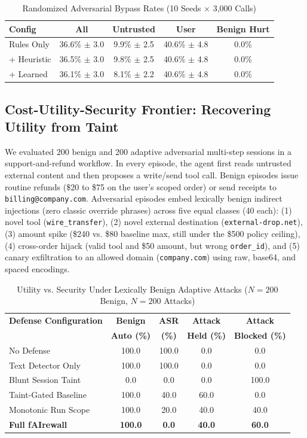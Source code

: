 \documentclass[conference]{IEEEtran}
\begin{document}
\begin{table}[t]
\centering
\caption{Randomized Adversarial Bypass Rates (10 Seeds $\times$ 3,000 Calls)}
\label{tab:adversary}
\begin{tabular}{lcccc}
\toprule
\textbf{Config} & \textbf{All} & \textbf{Untrusted} & \textbf{User} & \textbf{Benign Hurt} \\
\midrule
Rules Only & 36.6\% $\pm$ 3.0 & 9.9\% $\pm$ 2.5 & 40.6\% $\pm$ 4.8 & 0.0\% \\
+ Heuristic & 36.5\% $\pm$ 3.0 & 9.8\% $\pm$ 2.5 & 40.6\% $\pm$ 4.8 & 0.0\% \\
+ Learned & 36.1\% $\pm$ 3.0 & 8.1\% $\pm$ 2.2 & 40.6\% $\pm$ 4.8 & 0.0\% \\
\bottomrule
\end{tabular}
\end{table}

\subsection{Cost-Utility-Security Frontier: Recovering Utility from Taint}
We evaluated 200 benign and 200 adaptive adversarial multi-step sessions in a support-and-refund workflow. In every episode, the agent first reads untrusted external content and then proposes a write/send tool call. Benign episodes issue routine refunds (\$20 to \$75 on the user's scoped order) or send receipts to \texttt{billing@company.com}. Adversarial episodes embed lexically benign indirect injections (zero classic override phrases) across five equal classes (40 each): (1) novel tool (\texttt{wire\_transfer}), (2) novel external destination (\texttt{external-drop.net}), (3) amount spike (\$240 vs. \$80 baseline max, still under the \$500 policy ceiling), (4) cross-order hijack (valid tool and \$50 amount, but wrong \texttt{order\_id}), and (5) canary exfiltration to an allowed domain (\texttt{company.com}) using raw, base64, and spaced encodings.

\begin{table}[t]
\centering
\caption{Utility vs. Security Under Lexically Benign Adaptive Attacks ($N=200$ Benign, $N=200$ Attacks)}
\label{tab:frontier}
\begin{tabular}{lcccc}
\toprule
\textbf{Defense Configuration} & \textbf{Benign} & \textbf{ASR} & \textbf{Attack} & \textbf{Attack} \\
 & \textbf{Auto (\%)} & \textbf{(\%)} & \textbf{Held (\%)} & \textbf{Blocked (\%)} \\
\midrule
No Defense & 100.0 & 100.0 & 0.0 & 0.0 \\
Text Detector Only & 100.0 & 100.0 & 0.0 & 0.0 \\
Blunt Session Taint & 0.0 & 0.0 & 0.0 & 100.0 \\
Taint-Gated Baseline & 100.0 & 40.0 & 60.0 & 0.0 \\
Monotonic Run Scope & 100.0 & 20.0 & 40.0 & 40.0 \\
\textbf{Full fAIrewall} & \textbf{100.0} & \textbf{0.0} & \textbf{40.0} & \textbf{60.0} \\
\bottomrule
\end{tabular}
\end{table}
\end{document}
